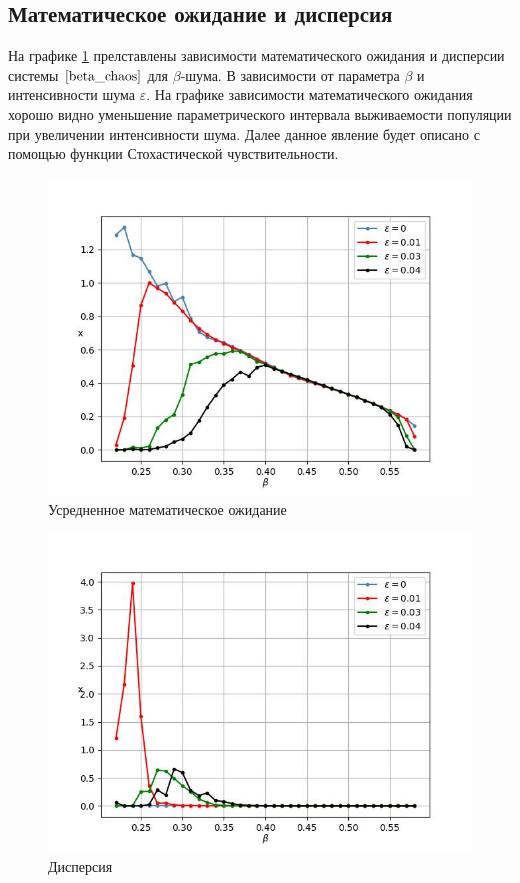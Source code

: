 \subsection{Математическое ожидание и дисперсия}

    На графике \ref{EV_cyclic} прелставлены зависимости математического ожидания и дисперсии системы \(\ref{beta_chaos}\) для \(\beta\)-шума. В зависимости от параметра \(\beta\) и интенсивности шума \(\varepsilon\). На графике зависимости математического ожидания хорошо видно уменьшение параметрического интервала выживаемости популяции при увеличении интенсивности шума. Далее данное явление будет описано с помощью функции Стохастической чувствительности.
        
    \begin{figure}
        \centering
        \includegraphics[width=\textwidth]{stochastic/images/EV_cyclic.jpg}
        
        \captionsetup{justification=centering}
        \caption{Усредненное математическое ожидание}
        \label{EV_cyclic}
    \end{figure}

    \begin{figure}
        \centering
        \includegraphics[width=\textwidth]{stochastic/images/variance_cyclic.jpg}
        
        \captionsetup{justification=centering}
        \caption{Дисперсия}
        \label{variance_cyclic}
    \end{figure}
